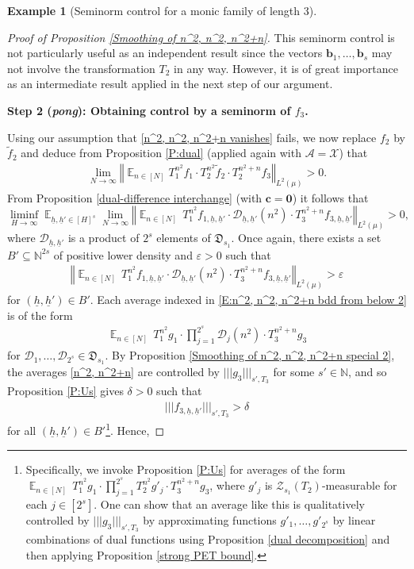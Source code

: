 \documentclass[11pt]{amsart}
\theoremstyle{definition}
\newtheorem{example}{Example}
\newcommand{\N}{{\mathbb N}}
\newcommand{\CA}{{\mathcal A}}
\newcommand{\CD}{{\mathcal D}}
\newcommand{\CX}{{\mathcal X}}
\newcommand{\CZ}{{\mathcal Z}}
\newcommand{\FD}{{\mathfrak D}}
\newcommand{\bc}{{\mathbf{c}}}
\renewcommand{\b}{{\textbf{b}}}
\newcommand{\uh}{{\underline{h}}}
\newcommand{\bzero}{{\boldsymbol{0}}}
\newcommand{\veps}{\varepsilon}
\newcommand{\norm}[1]{\left\Vert #1\right\Vert}
\newcommand{\nnorm}[1]{\lvert\!|\!| #1|\!|\!\rvert}
\DeclareMathOperator*{\E}{\mathbb{E}}
\begin{document}
\begin{example}[Seminorm control for a monic family of length 3]
\begin{proof}[Proof of Proposition \ref{Smoothing of n^2, n^2, n^2+n}]
This seminorm control is not particularly useful as an independent result since the vectors $\b_1, \ldots, \b_s$ may not involve the transformation $T_2$ in any way. However, it is of great importance as an intermediate result applied in the next step of our argument.

\smallskip
\textbf{Step 2 (\textit{pong}): Obtaining control by a seminorm of $f_3$.}
\smallskip

Using our assumption that \eqref{n^2, n^2, n^2+n vanishes} fails, we now replace $f_2$ by $\tilde{f}_2$ and deduce from Proposition \ref{P:dual} (applied again with $\CA = \CX$) that
\begin{align*}
    \lim_{N\to\infty}\norm{\E_{n\in[N]}T_1^{n^2} f_1 \cdot T_2^{n^2}\tilde{f}_2 \cdot T_2^{n^2+n}f_3}_{L^2(\mu)}>0.
\end{align*}
From Proposition \ref{dual-difference interchange} (with $\bc = \bzero$) it follows that
$$
\liminf_{H\to\infty}\E_{\uh,\uh'\in [H]^{s}}\lim_{N\to\infty}\norm{ \E_{n\in[N]} \, T_1^{n^2} f_{1, \uh, \uh'}\cdot \CD_{\uh,\uh'}(n^2) \cdot T_3^{n^2+n} f_{3, \uh, \uh'}}_{L^2(\mu)}>0,
$$
where $\CD_{\uh,\uh'}$ is a product of $2^s$ elements of $\FD_{s_1}$. Once again, there exists a set $B'\subseteq\N^{2s}$ of positive lower density and $\veps>0$ such that
\begin{align}\label{E:n^2, n^2, n^2+n bdd from below 2}
    \norm{ \E_{n\in[N]} \, T_1^{n^2} f_{1, \uh, \uh'}\cdot \CD_{\uh,\uh'}(n^2) \cdot T_3^{n^2+n} f_{3, \uh, \uh'}}_{L^2(\mu)} > \veps
\end{align}
for $(\uh, \uh')\in B'$.
Each average indexed in \eqref{E:n^2, n^2, n^2+n bdd from below 2} is of the form
\begin{align}\label{n^2, n^2+n}
    \E_{n\in[N]} \, T_1^{n^2} g_1  \cdot \prod_{j=1}^{2^s}\CD_{j}(n^2)\cdot  T_3^{n^2+n} g_3
\end{align}
for $\CD_1, \ldots, \CD_{2^s}\in\FD_{s_1}$. By Proposition \ref{Smoothing of n^2, n^2, n^2+n special 2}, the averages \eqref{n^2, n^2+n} are controlled by $\nnorm{g_3}_{s', T_3}$ for some $s'\in\N$, and so Proposition \ref{P:Us} gives $\delta>0$ such that
\begin{align*}
    \nnorm{f_{3, \uh, \uh'}}_{s', T_3} > \delta
\end{align*}
for all $(\uh, \uh')\in B'$\footnote{Specifically, we invoke Proposition \ref{P:Us} for averages of the form $\E_{n\in[N]}\,  T_1^{n^2}g_1 \cdot \prod_{j=1}^{2^{s}} T_2^{n^2} g'_j \cdot T_3^{n^2+n}g_3$, where $g'_j$ is $\CZ_{s_1}(T_2)$-measurable for each $j\in[2^{s}]$. One can show that an average like this is qualitatively controlled by $\nnorm{g_3}_{s', T_3}$ by approximating functions $g'_1, \ldots, g'_{2^{s}}$ by linear combinations of dual functions using Proposition \ref{dual decomposition} and then applying Proposition \ref{strong PET bound}.}. Hence,

\end{proof}
\end{example}
\end{document}
